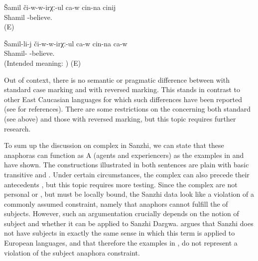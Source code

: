 \begin{exe}
	\ex	\label{ex:Rasul is believing in himself@13}
	\begin{xlist}
		\ex	\label{ex:Rasul is believing in himself@13A}
		\gll	Šamil	či-w-w-irχː-ul ca-w	cin-na	cinij\\
			Shamil	-believe.  	\\
		\glt	{} (E)

		\ex	\label{ex:Rasul is believing in himself@13B}
		\gll {*} Šamil-li-j	či-w-w-irχː-ul ca-w	cin-na	ca-w	\\
		{}	Shamil-	-believe.  	\\
		\glt	 (Intended meaning: ) (E)
	\end{xlist}
\end{exe}


Out of context, there is no semantic or pragmatic difference between  with standard case marking and  with reversed marking. This stands in contrast to other East Caucasian languages for which such differences have been reported (see \citealp{Forker2014} for references). There are some restrictions on the  concerning both standard  (see above) and those with reversed marking, but this topic requires further research.
%

To sum up the discussion on complex  in Sanzhi, we can state that these anaphoras can function as A (agents and experiencers) as the examples in  and  have shown. The constructions illustrated in both sentences are plain  with basic transitive and . Under certain circumstances, the complex  can also precede their antecedents , but this topic requires more testing. Since the complex  are not personal or , but must be locally bound, the Sanzhi data look like a violation of a commonly assumed constraint, namely that anaphors cannot fulfill the  of subjects. However, such an argumentation crucially depends on the notion of subject and whether it can be applied to Sanzhi Dargwa. \citet{Forker2014} argues that Sanzhi does not have subjects in exactly the same sense in which this term is applied to European languages, and that therefore the examples in ,  do not represent a violation of the subject anaphora constraint.


